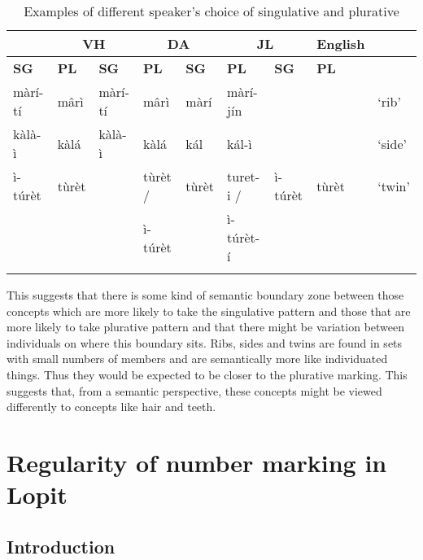 \documentclass[output=paper]{langsci/langscibook}
\begin{document}
\begin{table}
\begin{tabularx}{\textwidth}{lllllllll}
\lsptoprule

\multicolumn{2}{c}{ \textbf{AL}} & \multicolumn{2}{c}{ \textbf{VH}} & \multicolumn{2}{c}{ \textbf{DA}} & \multicolumn{2}{c}{ \textbf{JL}} & \textbf{English}\\ \midrule
\textbf{SG} & \textbf{PL} & \textbf{SG} & \textbf{PL} & \textbf{SG} & \textbf{PL} & \textbf{SG} & 
 \textbf{PL} & \\ \midrule
 m\`{a}r\'{i}-t\'{i} &  m\^{a}r\`{i} &  m\`{a}r\'{i}-t\'{i} &  m\^{a}r\`{i} &  m\`{a}r\'{i} &  m\`{a}r\'{i}-j\'{i}n &  &  & ‘rib’\\
 k\`{a}l\`{a}-\`{i} &  k\`{a}l\'{a} &  k\`{a}l\`{a}-\`{i} &  k\`{a}l\'{a} &  k\'{a}l &  k\'{a}l-\`{i} &  &  & ‘side’\\
 \`{i}-t\'{u}r\`{e}t &  t\`{u}r\`{e}t &  &  t\`{u}r\`{e}t / & {t\`{u}r\`{e}t } & {turet-i /}

&  \`{i}-t\'{u}r\`{e}t &  t\`{u}r\`{e}t & ‘twin’\\
&&&  \`{i}-t\'{u}r\`{e}t &&  \`{i}-t\'{u}r\`{e}t-\'{i} & & \\
\lspbottomrule
\end{tabularx}
\caption{Examples of different speaker’s choice of singulative and plurative}
\label{tab:moodie:8}
\end{table}

This suggests that there is some kind of semantic boundary zone between those concepts which are more likely to take the singulative pattern and those that are more likely to take plurative pattern and that there might be variation between individuals on where this boundary sits. Ribs, sides and twins are found in sets with small numbers of members and are semantically more like individuated things. Thus they would be expected to be closer to the plurative marking. This suggests that, from a semantic perspective, these concepts might be viewed differently to concepts like hair and teeth.

\section{Regularity of number marking in Lopit}\label{sec:moodie:4}


\subsection{Introduction} \label{sec:moodie:4.1}
\end{document}
